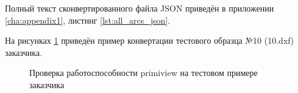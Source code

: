 Полный текст сконвертированного файла JSON приведён в приложении \ref{cha:appendix1}, листинг \ref{lst:all_arcs_json}.

На рисунках \ref{fig:tests} приведён пример конвертации тестового образца №10 (10.dxf) заказчика.

\begin{figure}[H]
	\centering
	\begin{minipage}[h]{0.3\linewidth}
	\end{minipage}
	\begin{minipage}[h]{0.6\linewidth}
	\end{minipage}
	\begin{minipage}[h]{0.4\linewidth}
	\end{minipage}
	\begin{minipage}[h]{0.4\linewidth}
	\end{minipage}
	\begin{minipage}[h]{0.4\linewidth}
	\end{minipage}
	\begin{minipage}[h]{0.4\linewidth}
	\end{minipage}
	\caption{Проверка работоспособности primiview на тестовом примере заказчика}
	\label{fig:tests}
\end{figure}

